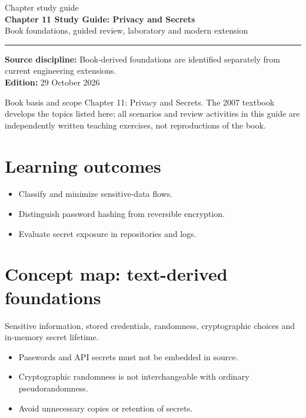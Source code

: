\documentclass[10pt,letterpaper]{article}
\begin{document}
\hypersetup{pageanchor=false}%
\begin{titlepage}
\vspace*{1.0in}
{\color{bluegray}\Large Chapter study guide}\\[1.0em]
{\color{navy}\Huge\bfseries Chapter 11 Study Guide: Privacy and Secrets}\\[0.7em]
{\Large Book foundations, guided review, laboratory and modern extension}\\[2.0em]
\rule{\linewidth}{1.0pt}
\vfill
\textbf{Source discipline:} Book-derived foundations are identified separately from current engineering extensions.\\
\textbf{Edition:} 29 October 2026
\end{titlepage}\hypersetup{pageanchor=true}
\tableofcontents
\clearpage
\begin{focusbox}{Book basis and scope}
Chapter 11: Privacy and Secrets. The 2007 textbook develops the topics listed here; all scenarios and review activities in this guide are independently written teaching exercises, not reproductions of the book.\end{focusbox}
\section{Learning outcomes}
\begin{itemize}
\item Classify and minimize sensitive-data flows.
\item Distinguish password hashing from reversible encryption.
\item Evaluate secret exposure in repositories and logs.
\end{itemize}

\section{Concept map: text-derived foundations}
Sensitive information, stored credentials, randomness, cryptographic choices and in-memory secret lifetime.
\begin{itemize}
\item Passwords and API secrets must not be embedded in source.
\item Cryptographic randomness is not interchangeable with ordinary pseudorandomness.
\item Avoid unnecessary copies or retention of secrets.
\end{itemize}
\end{document}
